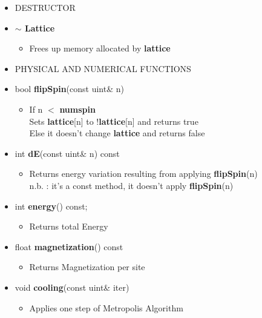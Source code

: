 \documentclass[11pt,a4paper]{article}
\begin{document}
\begin{itemize}
\begin{itemize}
		
		\item[]
		DESTRUCTOR \\
		
			\item[] \textbf{$\sim$ Lattice}	 
			\begin{itemize}
				\item[] Frees up memory allocated by \textbf{lattice} \\
			\end{itemize}		
		
\newpage 		
	
		\item[] 
		PHYSICAL AND NUMERICAL FUNCTIONS \\
 		
			\item[] bool \textbf{flipSpin}(const uint\& n)		 
			\begin{itemize}
				\item[] If n $<$ \textbf{num\textunderscore spin} \\
				Sets \textbf{lattice}[n] to !\textbf{lattice}[n] and returns true \\
				Else it doesn't change \textbf{lattice} and returns false 
						
			\end{itemize}

			\item[] int \textbf{dE}(const uint\& n) const		 
			\begin{itemize}
				\item[] Returns energy variation resulting from applying \textbf{flipSpin}(n) \\
						{\small
						\textsf{n.b.} : it's a const method, it doesn't apply \textbf{flipSpin}(n)
						} 
			\end{itemize}
			
			\item[] int \textbf{energy}() const;		 
			\begin{itemize}
				\item[] Returns total Energy 
			\end{itemize} 
			
			\item[] float \textbf{magnetization}() const		 
			\begin{itemize}
				\item[] Returns Magnetization per site  
				
			\end{itemize}
			
			\item[] void \textbf{cooling}(const uint\& iter) 		 
			\begin{itemize}
				\item[] Applies one step of Metropolis Algorithm 
			\end{itemize}
			

\end{itemize}
\end{itemize}
\end{document}
